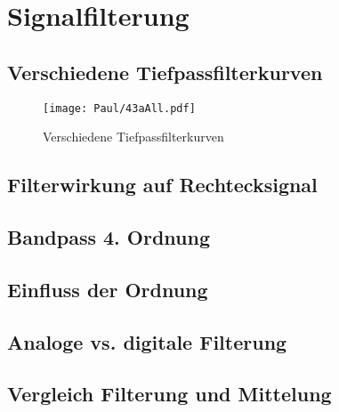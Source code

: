 \section{Signalfilterung}

\subsection{Verschiedene Tiefpassfilterkurven}
\begin{figure}[h]
    \centering
    \texttt{[image: Paul/43aAll.pdf]}
    \caption{Verschiedene Tiefpassfilterkurven}
\end{figure}


\subsection{Filterwirkung auf Rechtecksignal}


\subsection{Bandpass 4. Ordnung}


\subsection{Einfluss der Ordnung}


\subsection{Analoge vs. digitale Filterung}


\subsection{Vergleich Filterung und Mittelung}